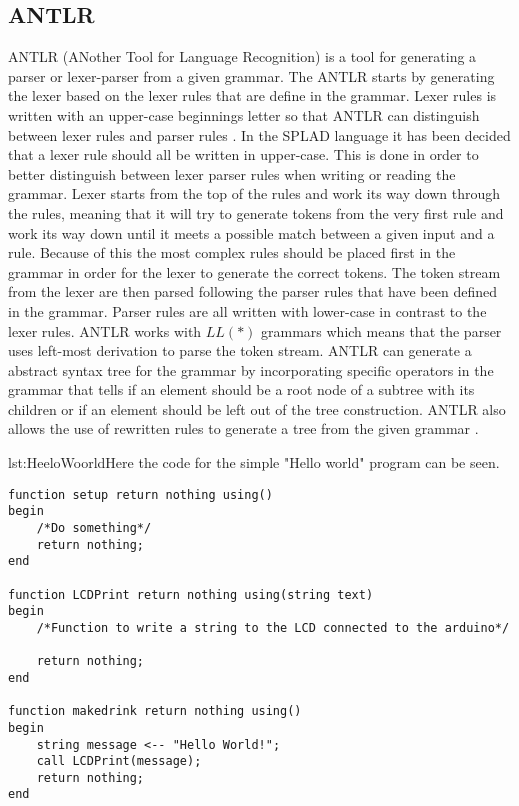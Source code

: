 \subsection{ANTLR}
ANTLR (ANother Tool for Language Recognition) is a tool for generating a parser or lexer-parser from a given grammar. The ANTLR starts by generating the lexer based on the lexer rules that are define in the grammar. Lexer rules is written with an upper-case beginnings letter so that ANTLR can distinguish between lexer rules and parser rules \citep{ANTLRLexer}.
In the SPLAD language it has been decided that a lexer rule should all be written in upper-case. This is done in order to better distinguish between lexer parser rules when writing or reading the grammar. Lexer starts from the top of the rules and work its way down through the rules, meaning that it will try to generate tokens from the very first rule and work its way down until it meets a possible match between a given input and a rule. Because of this the most complex rules should be placed first in the grammar in order for the lexer to generate the correct tokens. 
The token stream from the lexer are then parsed following the parser rules that have been defined in the grammar. Parser rules are all written with lower-case in contrast to the lexer rules. ANTLR works with $LL(*)$ grammars which means that the parser uses left-most derivation to parse the token stream. ANTLR can generate a abstract syntax tree for the grammar by incorporating specific operators in the grammar that tells if an element should be a root node of a subtree with its children or if an element should be left out of the tree construction. ANTLR also allows the use of rewritten rules to generate a tree from the given grammar \citep{ANTLRTreeCon}.

\begin{code}{lst:HeeloWoorld}{Here the code for the simple "Hello world" program can be seen.}
\begin{lstlisting}
function setup return nothing using()
begin
	/*Do something*/
	return nothing;
end

function LCDPrint return nothing using(string text)
begin
	/*Function to write a string to the LCD connected to the arduino*/
		
	return nothing;
end

function makedrink return nothing using()
begin
	string message <-- "Hello World!";
	call LCDPrint(message);
	return nothing;
end
\end{lstlisting}
\end{code}

